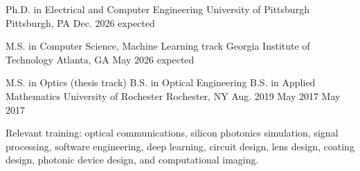 
\begin{cventries}
  \cventry
    {Ph.D. in Electrical and Computer Engineering}
    {University of Pittsburgh}
    {Pittsburgh, PA}
    {Dec. 2026 expected}
    {}
\vspace{-0.4cm}

  \cventry
    {M.S. in Computer Science, Machine Learning track}
    {Georgia Institute of Technology}
    {Atlanta, GA}
    {May 2026 expected}
    {}
\vspace{-0.4cm}

  \cventry
    {M.S. in Optics (thesis track) \linebreak B.S. in Optical Engineering \linebreak B.S. in Applied Mathematics}
    {University of Rochester}
    {Rochester, NY}
    {Aug. 2019 \linebreak May 2017 \linebreak May 2017}
    {
      \begin{cvitems}
        \item {Relevant training: optical communications, silicon photonics simulation, signal processing, software engineering, deep learning, circuit design, lens design, coating design, photonic device design, and computational imaging.}
      \end{cvitems}
    }
\vspace{-0.45cm}
\end{cventries}
